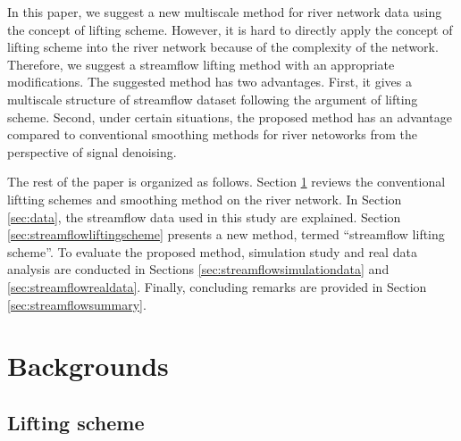 \documentclass[11pt,titlepage]{article}
\begin{document}
In this paper, we suggest a new multiscale method for river network data using the concept of lifting scheme. However, it is hard to directly apply the concept of lifting scheme into the river network because of the complexity of the network. Therefore, we suggest a streamflow lifting method with an appropriate modifications. The suggested method has two advantages. First, it gives a multiscale structure of streamflow dataset following the argument of lifting scheme. Second, under certain situations, the proposed method has an advantage compared to conventional smoothing methods for river netoworks from the perspective of signal denoising.

The rest of the paper is organized as follows. Section \ref{sec:lifting} reviews the conventional liftting schemes and smoothing method on the river network. In Section  \ref{sec:data}, the streamflow data used in this study are explained. Section \ref{sec:streamflowliftingscheme} presents a new method, termed ``streamflow lifting scheme''.  To evaluate the proposed method, simulation study and real data analysis are conducted in Sections \ref{sec:streamflowsimulationdata} and \ref{sec:streamflowrealdata}. Finally, concluding
remarks are provided in Section \ref{sec:streamflowsummary}.


\section{Backgrounds}\label{sec:lifting}

\subsection{Lifting scheme}
\end{document}
